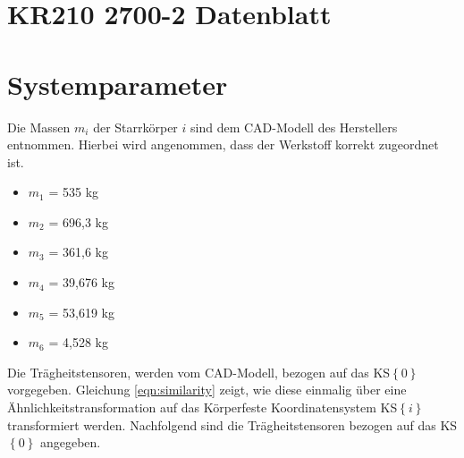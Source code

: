 \section{KR210 2700-2 Datenblatt}
\label{add:datenblatt}

\setcounter{section}{1}
\section{Systemparameter}
\label{add:Systemparameterdef}
Die Massen $m_i$ der Starrkörper $i$ sind dem CAD-Modell des Herstellers entnommen. Hierbei wird angenommen, dass der Werkstoff korrekt zugeordnet ist. 
%
\begin{itemize}
	\item $m_1$ = 535 kg
	\item $m_2$ = 696,3 kg
	\item $m_3$ = 361,6 kg
	\item $m_4$ = 39,676 kg
	\item $m_5$ = 53,619 kg
	\item $m_6$ = 4,528 kg
\end{itemize}
%
Die Trägheitstensoren, werden vom CAD-Modell, bezogen auf das KS$\left\{0\right\}$ vorgegeben. Gleichung \ref{eqn:similarity} zeigt, wie diese einmalig über eine Ähnlichkeitstransformation auf das Körperfeste Koordinatensystem KS$\left\{i\right\}$ transformiert werden. Nachfolgend sind die Trägheitstensoren bezogen auf das KS$\left\{0\right\}$ angegeben. 
%
